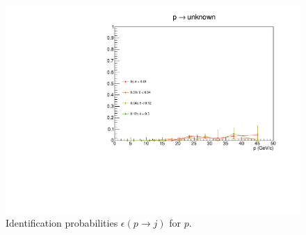 \begin{figure}[!p]
  \includegraphics[scale=0.38]{./gfx/pp_u.pdf}
	\caption{Identification probabilities $\epsilon(p \rightarrow j)$ for $p$.}
	\label{pic:Effpip}
\end{figure}

